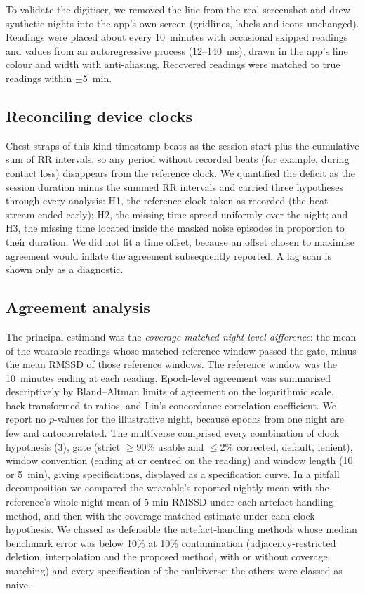 \documentclass[11pt,a4paper]{article}
\begin{document}
To validate the digitiser, we removed the line from the real screenshot and drew \nCharts{} synthetic nights into the app's own screen (gridlines, labels and icons unchanged). Readings were placed about every 10~minutes with occasional skipped readings and values from an autoregressive process (12--140~ms), drawn in the app's line colour and width with anti-aliasing. Recovered readings were matched to true readings within $\pm$5~min.

\subsection{Reconciling device clocks}
Chest straps of this kind timestamp beats as the session start plus the cumulative sum of RR intervals, so any period without recorded beats (for example, during contact loss) disappears from the reference clock. We quantified the deficit as the session duration minus the summed RR intervals and carried three hypotheses through every analysis: H1, the reference clock taken as recorded (the beat stream ended early); H2, the missing time spread uniformly over the night; and H3, the missing time located inside the masked noise episodes in proportion to their duration. We did not fit a time offset, because an offset chosen to maximise agreement would inflate the agreement subsequently reported. A lag scan is shown only as a diagnostic.

\subsection{Agreement analysis}
The principal estimand was the \emph{coverage-matched night-level difference}: the mean of the wearable readings whose matched reference window passed the gate, minus the mean RMSSD of those reference windows. The reference window was the 10~minutes ending at each reading. Epoch-level agreement was summarised descriptively by Bland--Altman limits of agreement on the logarithmic scale, back-transformed to ratios,\autocite{bland1986,bland1999} and Lin's concordance correlation coefficient.\autocite{lin1989} We report no $p$-values for the illustrative night, because epochs from one night are few and autocorrelated.\autocite{bland2007} The multiverse comprised every combination of clock hypothesis (3), gate (strict ${\geq}90\%$ usable and ${\leq}2\%$ corrected, default, lenient), window convention (ending at or centred on the reading) and window length (10 or 5~min), giving \nSpecs{} specifications, displayed as a specification curve.\autocite{steegen2016,simonsohn2020} In a pitfall decomposition we compared the wearable's reported nightly mean with the reference's whole-night mean of 5-min RMSSD under each artefact-handling method, and then with the coverage-matched estimate under each clock hypothesis. We classed as defensible the artefact-handling methods whose median benchmark error was below 10\% at 10\% contamination (adjacency-restricted deletion, interpolation and the proposed method, with or without coverage matching) and every specification of the multiverse; the others were classed as naive.
\end{document}
